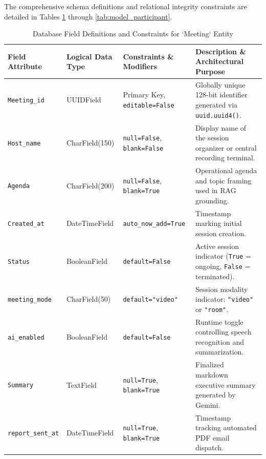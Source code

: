 \documentclass[12pt,oneside,letterpaper]{report}
\numberwithin{equation}{chapter} %
\begin{document}
The comprehensive schema definitions and relational integrity constraints are detailed in Tables \ref{tab:model_meeting} through \ref{tab:model_participant}.

\begin{table}[H]
\centering
\caption{Database Field Definitions and Constraints for `Meeting` Entity}
\label{tab:model_meeting}
\footnotesize
\begin{tabularx}{\textwidth}{p{3.2cm}p{2.5cm}p{3.2cm}X}
\toprule
\textbf{Field Attribute} & \textbf{Logical Data Type} & \textbf{Constraints \& Modifiers} & \textbf{Description \& Architectural Purpose} \\
\midrule
\texttt{Meeting\_id} & UUIDField & Primary Key, \texttt{editable=False} & Globally unique 128-bit identifier generated via \texttt{uuid.uuid4()}. \\
\texttt{Host\_name} & CharField(150) & \texttt{null=False}, \texttt{blank=False} & Display name of the session organizer or central recording terminal. \\
\texttt{Agenda} & CharField(200) & \texttt{null=False}, \texttt{blank=True} & Operational agenda and topic framing used in RAG grounding. \\
\texttt{Created\_at} & DateTimeField & \texttt{auto\_now\_add=True} & Timestamp marking initial session creation. \\
\texttt{Status} & BooleanField & \texttt{default=False} & Active session indicator (\texttt{True} = ongoing, \texttt{False} = terminated). \\
\texttt{meeting\_mode} & CharField(50) & \texttt{default="video"} & Session modality indicator: \texttt{"video"} or \texttt{"room"}. \\
\texttt{ai\_enabled} & BooleanField & \texttt{default=False} & Runtime toggle controlling speech recognition and summarization. \\
\texttt{Summary} & TextField & \texttt{null=True}, \texttt{blank=True} & Finalized markdown executive summary generated by Gemini. \\
\texttt{report\_sent\_at} & DateTimeField & \texttt{null=True}, \texttt{blank=True} & Timestamp tracking automated PDF email dispatch. \\
\bottomrule
\end{tabularx}
\end{table}
\end{document}
